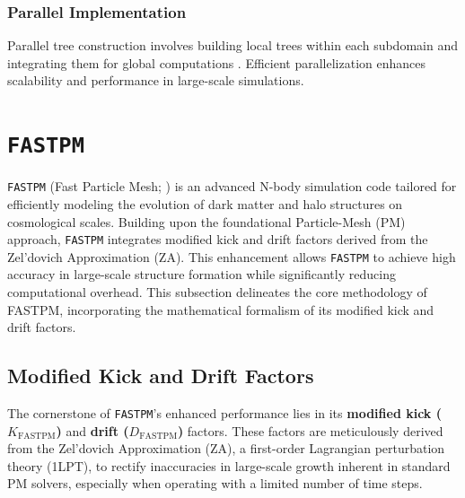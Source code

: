 \subsubsection{Parallel Implementation}

Parallel tree construction involves building local trees within each subdomain and integrating them for global computations \citep{DUBINSKI1996133}. Efficient parallelization enhances scalability and performance in large-scale simulations.

\section{\texttt{FASTPM}}
\texttt{FASTPM} (Fast Particle Mesh; \citealt{10.1093/mnras/stw2123}) is an advanced N-body simulation code tailored for efficiently modeling the evolution of dark matter and halo structures on cosmological scales. Building upon the foundational Particle-Mesh (PM) approach, \texttt{FASTPM} integrates modified kick and drift factors derived from the Zel'dovich Approximation (ZA). This enhancement allows \texttt{FASTPM} to achieve high accuracy in large-scale structure formation while significantly reducing computational overhead. This subsection delineates the core methodology of FASTPM, incorporating the mathematical formalism of its modified kick and drift factors.

\subsection{Modified Kick and Drift Factors}
The cornerstone of \texttt{FASTPM}'s enhanced performance lies in its \textbf{modified kick ($K_{\text{FASTPM}}$)} and \textbf{drift ($D_{\text{FASTPM}}$)} factors. These factors are meticulously derived from the Zel'dovich Approximation (ZA), a first-order Lagrangian perturbation theory (1LPT), to rectify inaccuracies in large-scale growth inherent in standard PM solvers, especially when operating with a limited number of time steps.

